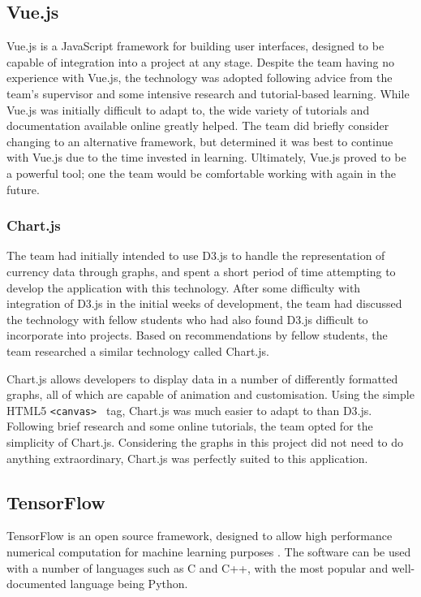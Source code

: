 \subsection{Vue.js}
Vue.js is a JavaScript framework for building user interfaces, designed to be capable of integration into a project at any stage. Despite the team having no experience with Vue.js, the technology was adopted following advice from the team's supervisor and some intensive research and tutorial-based learning. While Vue.js was initially difficult to adapt to, the wide variety of tutorials and documentation available online greatly helped. The team did briefly consider changing to an alternative framework, but determined it was best to continue with Vue.js due to the time invested in learning. Ultimately, Vue.js proved to be a powerful tool; one the team would be comfortable working with again in the future. 

\subsubsection{Chart.js}
The team had initially intended to use D3.js to handle the representation of currency data through graphs, and spent a short period of time attempting to develop the application with this technology. After some difficulty with integration of D3.js in the initial weeks of development, the team had discussed the technology with fellow students who had also found D3.js difficult to incorporate into projects. Based on recommendations by fellow students, the team researched a similar technology called Chart.js.

Chart.js \cite{chartjs} allows developers to display data in a number of differently formatted graphs, all of which are capable of animation and customisation. Using the simple HTML5 \texttt{<canvas> } tag, Chart.js was much easier to adapt to than D3.js. Following brief research and some online tutorials, the team opted for the simplicity of Chart.js. Considering the graphs in this project did not need to do anything extraordinary, Chart.js was perfectly suited to this application.

\subsection{TensorFlow}
TensorFlow is an open source framework, designed to allow high performance numerical computation for machine learning purposes \cite{tensorflow}. The software can be used with a number of languages such as C and C++, with the most popular and well-documented language being Python. 

